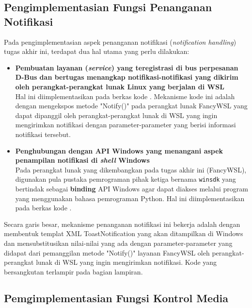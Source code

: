 \subsection{Pengimplementasian Fungsi Penanganan Notifikasi}

Pada pengimplementasian aspek penanganan notifikasi (\textit{notification handling}) tugas akhir ini, terdapat dua hal utama yang perlu dilakukan:
\begin{itemize}
    \item \textbf{Pembuatan layanan (\textit{service}) yang teregistrasi di bus perpesanan D-Bus dan bertugas menangkap notifikasi-notifikasi yang dikirim oleh perangkat-perangkat lunak Linux yang berjalan di WSL}\\
    Hal ini diimplementasikan pada berkas kode . Mekanisme kode ini adalah dengan mengekspos metode "Notify()" pada perangkat lunak FancyWSL yang dapat dipanggil oleh perangkat-perangkat lunak di WSL yang ingin mengirimkan notifikasi dengan parameter-parameter yang berisi informasi notifikasi tersebut.

    \item \textbf{Penghubungan dengan API Windows yang menangani aspek penampilan notifikasi di \textit{shell} Windows}\\
    Pada perangkat lunak yang dikembangkan pada tugas akhir ini (FancyWSL), digunakan pula pustaka pemrograman pihak ketiga bernama \verb|winsdk| yang bertindak sebagai \textbf{binding} API Windows agar dapat diakses melalui program yang menggunakan bahasa pemrograman Python. Hal ini diimplementasikan pada berkas kode .
\end{itemize}

Secara garis besar, mekanisme penanganan notifikasi ini bekerja adalah dengan membentuk templat XML ToastNotification yang akan ditampilkan di Windows dan mensubstitusikan nilai-nilai yang ada dengan parameter-parameter yang didapat dari pemanggilan metode "Notify()" layanan FancyWSL oleh perangkat-perangkat lunak di WSL yang ingin mengirimkan notifikasi. Kode yang bersangkutan terlampir pada bagian lampiran.

\subsection{Pemgimplementasian Fungsi Kontrol Media}

